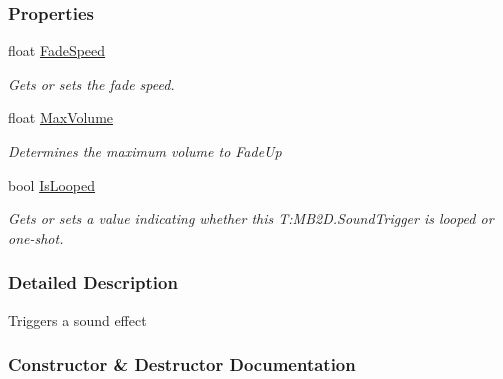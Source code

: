 \subsubsection*{Properties}
\begin{DoxyCompactItemize}
\item 
float \hyperlink{class_m_b2_d_1_1_sound_trigger_aff38429508a9f7d6d63e21ccb9605c16}{Fade\+Speed}
\begin{DoxyCompactList}\small\item\em Gets or sets the fade speed. \end{DoxyCompactList}\item 
float \hyperlink{class_m_b2_d_1_1_sound_trigger_a9b9555d5350b4f541e72adcee8f71e27}{Max\+Volume}
\begin{DoxyCompactList}\small\item\em Determines the maximum volume to Fade\+Up \end{DoxyCompactList}\item 
bool \hyperlink{class_m_b2_d_1_1_sound_trigger_a5b2cdaf1ced61a86af6a6b133e028a2f}{Is\+Looped}
\begin{DoxyCompactList}\small\item\em Gets or sets a value indicating whether this T\+:\+M\+B2\+D.\+Sound\+Trigger is looped or one-\/shot. \end{DoxyCompactList}\end{DoxyCompactItemize}


\subsubsection{Detailed Description}
Triggers a sound effect 



\subsubsection{Constructor \& Destructor Documentation}
\hypertarget{class_m_b2_d_1_1_sound_trigger_ae52791ea1d0f84f11dac81a8e7f34d64}{}\label{class_m_b2_d_1_1_sound_trigger_ae52791ea1d0f84f11dac81a8e7f34d64} 

